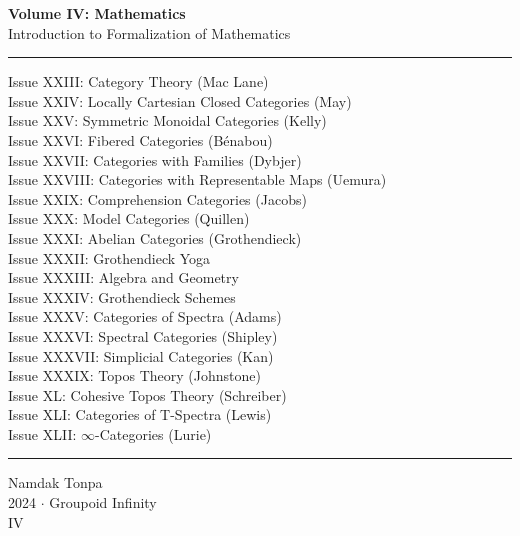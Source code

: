 \documentclass{article}
\begin{document}
\begin{titlepage}
    \centering
    \vspace*{0.5in}
    \Huge
    \textbf{Volume IV: Mathematics} \\
    \LARGE
    Introduction to Formalization of Mathematics \\
    \vspace{1.5in}
    \rule{\textwidth}{0.4pt}
    \small
    \flushleft
    Issue XXIII: Category Theory (Mac Lane) \\
    Issue XXIV: Locally Cartesian Closed Categories (May) \\
    Issue XXV: Symmetric Monoidal Categories (Kelly) \\
    Issue XXVI: Fibered Categories (Bénabou) \\
    Issue XXVII: Categories with Families (Dybjer) \\
    Issue XXVIII: Categories with Representable Maps (Uemura) \\
    Issue XXIX: Comprehension Categories (Jacobs) \\
    Issue XXX: Model Categories (Quillen) \\
    Issue XXXI: Abelian Categories (Grothendieck) \\
    Issue XXXII: Grothendieck Yoga \\
    Issue XXXIII: Algebra and Geometry \\
    Issue XXXIV: Grothendieck Schemes \\
    Issue XXXV: Categories of Spectra (Adams) \\
    Issue XXXVI: Spectral Categories (Shipley) \\
    Issue XXXVII: Simplicial Categories (Kan) \\
    Issue XXXIX: Topos Theory (Johnstone) \\
    Issue XL: Cohesive Topos Theory (Schreiber) \\
    Issue XLI: Categories of T-Spectra (Lewis) \\
    Issue XLII: $\infty$-Categories (Lurie) \\
    \rule{\textwidth}{0.4pt}
    \centering
    \vfill
    \large
    Namdak Tonpa \\
    \Large
    2024 $\cdot$ Groupoid Infinity \\
    IV
\end{titlepage}
\end{document}
